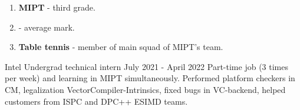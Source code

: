 \documentclass[9pt]{developercv} %
\begin{document}
\vspace{0.5cm}



\begin{minipage}[t]{0.4\textwidth} %
	\vspace{-\baselineskip} %
	
	\begin{enumerate}
	    \item \textbf{MIPT} - third grade.
	    \item {} - average mark.
	    \item \textbf{Table tennis} - member of main squad of MIPT's team.
	\end{enumerate}
	
\end{minipage}
\hfill %
\begin{minipage}[t]{0.5\textwidth} %
	\vspace{-\baselineskip} %
	\begin{barchart}{5.5}
	\end{barchart}
\end{minipage}


\begin{entrylist}
	\entry
		{Intel}
		{Undergrad technical intern}
		{July 2021 - April 2022}
		{Part-time job (3 times per week) and learning in MIPT simultaneously. Performed platform checkers in CM, legalization VectorCompiler-Intrinsics, fixed bugs in VC-backend, helped customers from ISPC and DPC++ ESIMD teams.}
\end{entrylist}
\end{document}
